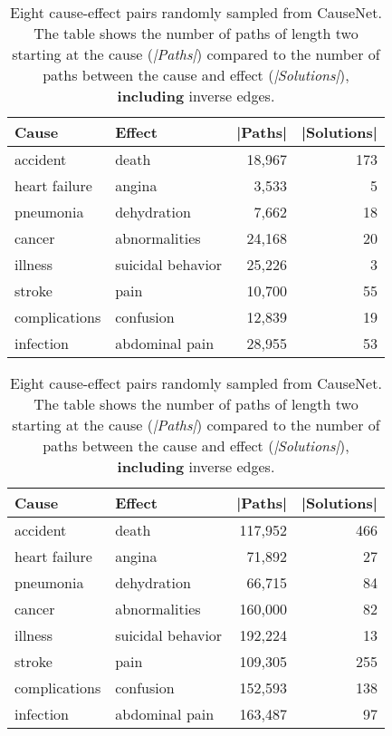 \begin{table}[t]
\caption{Eight cause-effect pairs randomly sampled from CauseNet. The table shows the number of paths of length two starting at the cause (\textit{|Paths|}) compared to
		 the number of paths between the cause and effect (\textit{|Solutions|}), \textbf{not including} inverse edges.
		}
\label{table-path-complexity}
\centering
\begin{tabular}{llrr} 
			\toprule
			\textbf{Cause} & \textbf{Effect} & \textbf{|Paths|} & \textbf{|Solutions|}\\
			\midrule
		   accident & death & 18,967 & 173 \\
		   heart failure & angina &	3,533 &	5	\\
		   pneumonia & dehydration &	7,662 &	18	\\
		   cancer & abnormalities &	24,168 &	20	\\
		   illness & suicidal behavior & 25,226 &	3	\\
		   stroke  & pain	& 10,700 & 55 \\
		   complications & confusion & 12,839 &	19	\\
		   infection & abdominal pain &28,955 &	53	\\
			\bottomrule
\end{tabular}
\bigskip
\caption{Eight cause-effect pairs randomly sampled from CauseNet. The table shows the number of paths of length two starting at the cause (\textit{|Paths|}) compared to
		 the number of paths between the cause and effect (\textit{|Solutions|}), \textbf{including} inverse edges.
}
\label{table-path-complexity-inverse}
\centering
\begin{tabular}{llrr} 
			\toprule
			\textbf{Cause} & \textbf{Effect} & \textbf{|Paths|} & \textbf{|Solutions|} \\
			\midrule
		   accident & death & 117,952 & 466 \\
		   heart failure & angina &	71,892 &	27	\\
		   pneumonia & dehydration &	66,715 &	84	\\
		   cancer & abnormalities &	160,000 &	82	\\
		   illness & suicidal behavior & 192,224 &	13	\\
		   stroke  & pain	& 109,305 & 255 \\
		   complications & confusion & 152,593 & 138 \\
		   infection & abdominal pain & 163,487 &	97	\\
			\bottomrule
\end{tabular}
\end{table}

